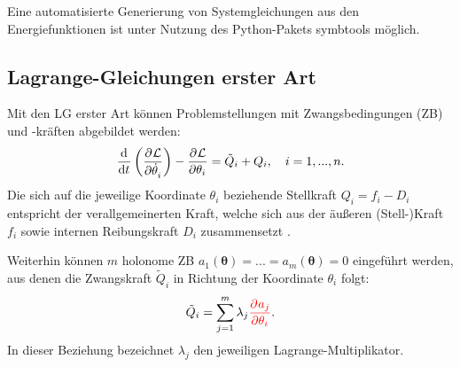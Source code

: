 Eine automatisierte Generierung von Systemgleichungen aus den Energiefunktionen ist unter Nutzung des Python-Pakets symbtools \cite{symbtools} möglich.

\subsection{Lagrange-Gleichungen erster Art}
\label{sec:Lagrange1_theory}

Mit den LG erster Art können Problemstellungen mit Zwangsbedingungen (ZB) und -kräften abgebildet werden:
\begin{equation}
	\label{eq:lagrange1}
	\frac{\mathrm{d}^{}}{\mathrm{d}{t}^{}}\left(\frac{\partial^{}\mathcal{L}}{\partial{\dot{\theta}_i}^{}} \right) - \frac{\partial^{}\mathcal{L}}{\partial{\theta_i}^{}} = \tilde{Q}_i + Q_i, \quad i = 1, ..., n.
\end{equation}
Die sich auf die jeweilige Koordinate $\theta_i$ beziehende Stellkraft $Q_i = f_i - D_i$ entspricht der verallgemeinerten Kraft, welche sich aus der äußeren (Stell-)Kraft $f_i$ sowie internen Reibungskraft $D_i$ zusammensetzt \cite[S. 49]{Lagrange}.

Weiterhin können $m$ holonome ZB $a_1(\boldsymbol{\theta}) = ... = a_m(\boldsymbol{\theta}) = 0$ eingeführt werden, aus denen die Zwangskraft $\tilde{Q}_i$ in Richtung der Koordinate $\theta_i$ folgt:
\begin{equation}
	\tilde{Q}_i = \sum_{j = 1}^m \lambda_j \textcolor{red}{\frac{\partial^{}a_j}{\partial{\theta_i}^{}}}.
\end{equation}
In dieser Beziehung bezeichnet $\lambda_j$ den jeweiligen Lagrange-Multiplikator.

